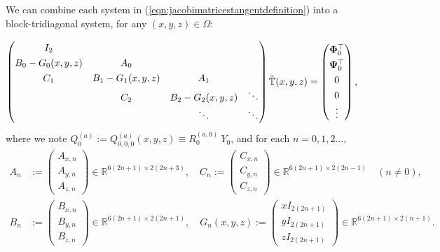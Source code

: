 \documentclass[11pt, oneside]{article}   	%
\newcommand{\R}{\mathbb{R}}
\newcommand{\genjac}{R}
\newcommand{\scop}{Q}
\newcommand{\scopa}{\scop^{(a)}}
\newcommand{\ch}{Y}
\newcommand{\bigtsop}{\mathbb{T}}
\newcommand{\bigtsopt}{\tilde{\bigtsop}}
\newcommand{\tsopi}{\bm{\Phi}}
\newcommand{\tsopii}{\bm{\Psi}}
\begin{document}
We can combine each system in (\ref{eqn:jacobimatricestangentdefinition}) into a block-tridiagonal system, for any $(x,y,z) \in \Omega$:

\begin{align*}
\renewcommand\arraystretch{1.3}
\begin{pmatrix}
		I_2 & & & \\
		B_0-G_0(x,y,z) & A_0 & & \\
		C_1 & B_1-G_1(x,y,z) & \quad A_1 \quad & \\
		& C_2 & B_2 - G_2(x,y,z)  & \ddots \\
		& & \ddots &\ddots
\end{pmatrix}
\bigtsopt(x,y,z)
=
\begin{pmatrix}
	 \tsopi_0^\top \\ \tsopii_0^\top \\ 0 \\ 0 \\ \vdots  \\
\end{pmatrix},
\end{align*}
where we note $\scopa_0 := \scopa_{0,0,0}(x,y,z) \equiv \genjac_0^{(a,0)} \: \ch_0$, and for each $n = 0,1,2\dots$,
\begin{align*}
A_n &:= \begin{pmatrix}
		A_{x,n} \\
		A_{y,n} \\
		A_{z,n}
	    \end{pmatrix} \in \R^{6(2n+1)\times2(2n+3)}, \quad
C_n := \begin{pmatrix}
		C_{x,n} \\
		C_{y,n} \\
		C_{z,n}
	    \end{pmatrix} \in \R^{6(2n+1)\times2(2n-1)} \quad (n \ne 0), \nonumber \\
B_n &:= \begin{pmatrix}
		B_{x,n} \\
		B_{y,n} \\
		B_{z,n}
	    \end{pmatrix} \in \R^{6(2n+1)\times2(2n+1)}, \quad
G_n(x,y,z) := \begin{pmatrix}
		xI_{2(2n+1)} \\
		yI_{2(2n+1)} \\
		zI_{2(2n+1)}
	    \end{pmatrix} \in \R^{6(2n+1)\times2(n+1)}.
\end{align*}
 
\end{document}
